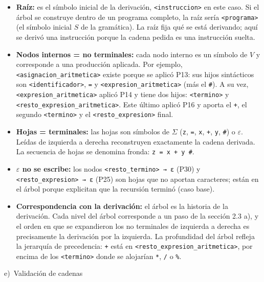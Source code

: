 \documentclass[11pt,letterpaper]{article}
\newcommand{\letra}[2]{\par\medskip\noindent #1)~#2\par\smallskip}
\begin{document}
\begin{itemize}
  \item \textbf{Raíz:} es el símbolo inicial de la derivación, \lstinline|<instruccion>| en este caso. Si el
        árbol se construye dentro de un programa completo, la raíz sería \lstinline|<programa>| (el símbolo
        inicial $S$ de la gramática). La raíz fija qué se está derivando; aquí se derivó una instrucción
        porque la cadena pedida es una instrucción suelta.
  \item \textbf{Nodos internos = no terminales:} cada nodo interno es un símbolo de $V$ y corresponde a una
        producción aplicada. Por ejemplo, \lstinline|<asignacion_aritmetica>| existe porque se aplicó P13: sus
        hijos sintácticos son \lstinline|<identificador>|, \lstinline|=| y
        \lstinline|<expresion_aritmetica>| (más el \lstinline|#|). A su vez,
        \lstinline|<expresion_aritmetica>| aplicó P14 y tiene dos hijos: \lstinline|<termino>| y
        \lstinline|<resto_expresion_aritmetica>|. Este último aplicó P16 y aporta el \lstinline|+|, el segundo
        \lstinline|<termino>| y el \lstinline|<resto_expresion>| final.
  \item \textbf{Hojas = terminales:} las hojas son símbolos de $\Sigma$ (\lstinline|z|, \lstinline|=|,
        \lstinline|x|, \lstinline|+|, \lstinline|y|, \lstinline|#|) o $\varepsilon$. Leídas de izquierda a
        derecha reconstruyen exactamente la cadena derivada. La secuencia de hojas se denomina fronda:
        \lstinline|z = x + y #|.
  \item \textbf{$\varepsilon$ no se escribe:} los nodos \lstinline|<resto_termino> → ε| (P30) y
        \lstinline|<resto_expresion> → ε| (P25) son hojas que no aportan caracteres; están en el árbol porque
        explicitan que la recursión terminó (caso base).
  \item \textbf{Correspondencia con la derivación:} el árbol es la historia de la derivación. Cada nivel del
        árbol corresponde a un paso de la sección 2.3 a), y el orden en que se expandieron los no terminales
        de izquierda a derecha es precisamente la derivación por la izquierda. La profundidad del árbol refleja
        la jerarquía de precedencia: \lstinline|+| está en \lstinline|<resto_expresion_aritmetica>|, por encima
        de los \lstinline|<termino>| donde se alojarían \lstinline|*|, \lstinline|/| o \lstinline|%|.
\end{itemize}

\letra{e}{Validación de cadenas}
\end{document}
